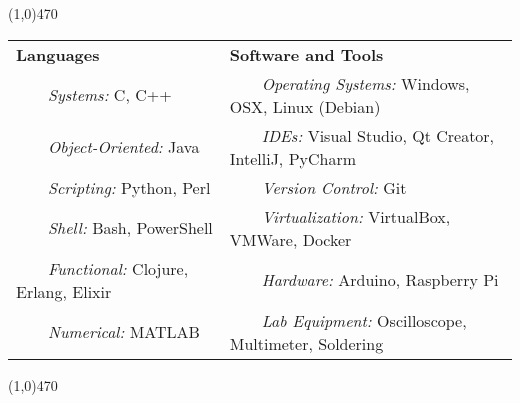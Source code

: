 \documentclass[11pt, a4paper]{article} %
\newcommand{\tabitem}{~~\llap{\textbullet}~~}
\begin{document}
\noindent \line(1,0){470}\\

 \smallskip
\vspace{-10pt}
\begin{center}
\begin{tabular}{l|l}
	{\bf Languages} & {\bf Software and Tools} \\
	\tabitem \textit{Systems:} C, C++ & \tabitem \textit{Operating Systems:} Windows, OSX, Linux (Debian)\\
	\tabitem \textit{Object-Oriented:} Java & \tabitem \textit{IDEs:} Visual Studio, Qt Creator, IntelliJ, PyCharm\\
	\tabitem \textit{Scripting:} Python, Perl & \tabitem \textit{Version Control:} Git\\
	\tabitem \textit{Shell:} Bash, PowerShell & \tabitem \textit{Virtualization:} VirtualBox, VMWare, Docker \\
	\tabitem \textit{Functional:} Clojure, Erlang, Elixir & \tabitem \textit{Hardware:} Arduino, Raspberry Pi\\
	\tabitem \textit{Numerical:} MATLAB & \tabitem \textit{Lab Equipment:} Oscilloscope, Multimeter, Soldering \\
\end{tabular}
\end{center}

\noindent \line(1,0){470} \\
\end{document}
